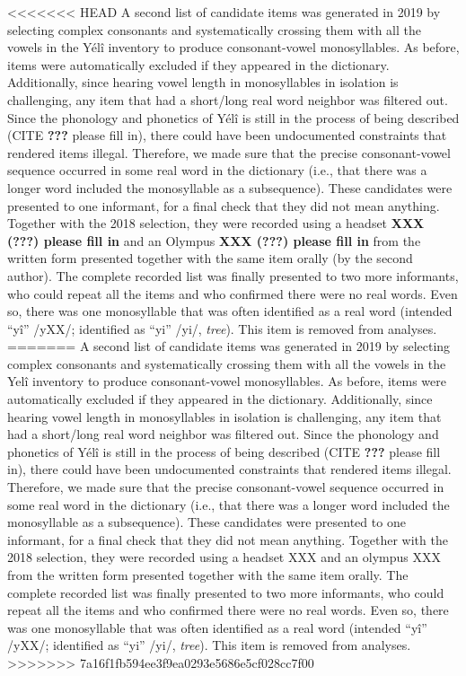 \documentclass[english,,man,floatsintext]{apa6}
\begin{document}
<<<<<<< HEAD
A second list of candidate items was generated in 2019 by selecting complex consonants and systematically crossing them with all the vowels in the Yélî inventory to produce consonant-vowel monosyllables. As before, items were automatically excluded if they appeared in the dictionary. Additionally, since hearing vowel length in monosyllables in isolation is challenging, any item that had a short/long real word neighbor was filtered out. Since the phonology and phonetics of Yélî is still in the process of being described (CITE {\textbf{???}} please fill in), there could have been undocumented constraints that rendered items illegal. Therefore, we made sure that the precise consonant-vowel sequence occurred in some real word in the dictionary (i.e., that there was a longer word included the monosyllable as a subsequence). These candidates were presented to one informant, for a final check that they did not mean anything. Together with the 2018 selection, they were recorded using a headset \textbf{XXX ({\textbf{???}}) please fill in} and an Olympus \textbf{XXX ({\textbf{???}}) please fill in} from the written form presented together with the same item orally (by the second author). The complete recorded list was finally presented to two more informants, who could repeat all the items and who confirmed there were no real words. Even so, there was one monosyllable that was often identified as a real word (intended \enquote{yî} /yXX/; identified as \enquote{yi} /yi/, \emph{tree}). This item is removed from analyses.
=======
A second list of candidate items was generated in 2019 by selecting complex consonants and systematically crossing them with all the vowels in the Yelî inventory to produce consonant-vowel monosyllables. As before, items were automatically excluded if they appeared in the dictionary. Additionally, since hearing vowel length in monosyllables in isolation is challenging, any item that had a short/long real word neighbor was filtered out. Since the phonology and phonetics of Yélî is still in the process of being described (CITE {\textbf{???}} please fill in), there could have been undocumented constraints that rendered items illegal. Therefore, we made sure that the precise consonant-vowel sequence occurred in some real word in the dictionary (i.e., that there was a longer word included the monosyllable as a subsequence). These candidates were presented to one informant, for a final check that they did not mean anything. Together with the 2018 selection, they were recorded using a headset XXX and an olympus XXX from the written form presented together with the same item orally. The complete recorded list was finally presented to two more informants, who could repeat all the items and who confirmed there were no real words. Even so, there was one monosyllable that was often identified as a real word (intended \enquote{yî} /yXX/; identified as \enquote{yi} /yi/, \emph{tree}). This item is removed from analyses.
>>>>>>> 7a16f1fb594ee3f9ea0293e5686e5cf028cc7f00
\end{document}
